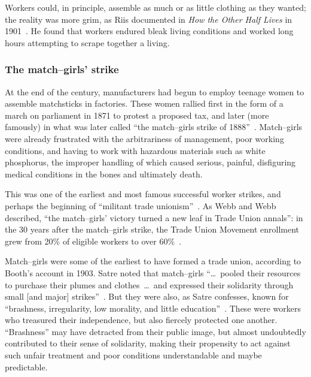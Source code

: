 \documentclass[pn4226]{subfiles}
\begin{document}
Workers could, in principle, assemble as much or as little clothing as they wanted;
the reality was more grim, as
Riis documented in \textit{How the Other Half Lives} in 1901~\cite{riisOtherSideLives}.
He found that
workers endured bleak living conditions and
worked long hours attempting to scrape together a living.


\subsubsection{The match--girls' strike}

At the end of the  century,
manufacturers had begun to employ teenage women to assemble matchsticks in factories.
These women rallied first in the form of a march on parliament in 1871 to protest a proposed tax, and 
later (more famously) in what was later called ``the match--girls strike of 1888''~\cite{10.2307/3827491}.
Match--girls were already frustrated with
the arbitrariness of management,
poor working conditions, and
having to work with hazardous materials such as white phosphorus, the improper handling of which
caused serious, painful, disfiguring medical conditions in the bones and ultimately death.

This was one of the earliest and most famous successful worker strikes,
and perhaps the beginning of ``militant trade unionism''~\cite{10.2307/3827491}.
As Webb and Webb described,
``the match--girls' victory turned a new leaf in Trade Union annals'': in the 30 years after the match--girls strike,
the Trade Union Movement enrollment grew from 20\% of eligible workers to over 60\%~\cite{weyer1894history}.

Match--girls were some of the earliest to have formed a trade union,
according to Booth's account in 1903. %
Satre noted that match--girls
``\dots~pooled their resources to purchase their plumes and clothes~\dots~and expressed their solidarity through small [and major] strikes''~\cite{booth1903life}.
But they were also, as Satre confesses, known for ``brashness, irregularity, low morality, and little education''~\cite{10.2307/3827491}.
These were workers who treasured their independence, but also fiercely protected one another. %
``Brashness'' may have detracted from their public image, but almost undoubtedly contributed to their sense of solidarity,
making their propensity to act against such unfair treatment and poor conditions understandable and maybe predictable.
\end{document}
